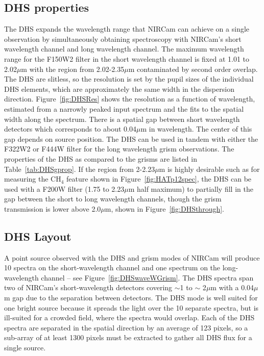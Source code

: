 \documentclass[iop]{emulateapj}
\newcommand{\DHSgap}{0.04}
\begin{document}
\subsection{DHS properties}
The DHS expands the wavelength range that NIRCam can achieve on a single observation by simultaneously obtaining spectroscopy with NIRCam's short wavelength channel and long wavelength channel.
The maximum wavelength range for the F150W2 filter in the short wavelength channel is fixed at 1.01 to 2.02$\mu$m with the region from 2.02-2.35$\mu$m contaminated by second order overlap.
The DHS are slitless, so the resolution is set by the pupil sizes of the individual DHS elements, which are approximately the same width in the dispersion direction.
Figure~\ref{fig:DHSRes} shows the resolution as a function of wavelength, estimated from a narrowly peaked input spectrum and the fits to the spatial width along the spectrum.
There is a spatial gap between short wavelength detectors which corresponds to about \DHSgap$\mu$m in wavelength.
The center of this gap depends on source position.
The DHS can be used in tandem with either the F322W2 or F444W filter for the long wavelength grism observations.
The properties of the DHS as compared to the grisms are listed in Table~\ref{tab:DHSgprop}.
If the region from 2-2.23$\mu$m is highly desirable such as for measuring the CH$_4$ feature shown in Figure~\ref{fig:HATp12spec}, the DHS can be used with a F200W filter (1.75 to 2.23$\mu$m half maximum) to partially fill in the gap between the short to long wavelength channels, though the grism transmission is lower above 2.0$\mu$m, shown in Figure~\ref{fig:DHSthrough}. 


\subsection{DHS Layout}\label{sec:layout}

A point source observed with the DHS and grism modes of NIRCam will produce 10 spectra on the short-wavelength channel and one spectrum on the long-wavelength channel -- see Figure~\ref{fig:DHSwaveWGrism}.
The DHS spectra span two of NIRCam's short-wavelength detectors covering $\sim$1 to $\sim$ 2$\mu$m with a \DHSgap$\mu$m gap due to the separation between detectors.
The DHS mode is well suited for one bright source because it spreads the light over the 10 separate spectra, but is ill-suited for a crowded field, where the spectra would overlap.
Each of the DHS spectra are separated in the spatial direction by an average of 123 pixels, so a sub-array of at least 1300 pixels must be extracted to gather all DHS flux for a single source.
\end{document}
